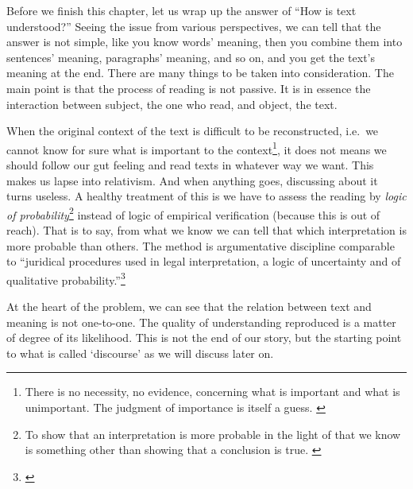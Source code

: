 Before we finish this chapter, let us wrap up the answer of ``How is text understood?'' Seeing the issue from various perspectives, we can tell that the answer is not simple, like you know words' meaning, then you combine them into sentences' meaning, paragraphs' meaning, and so on, and you get the text's meaning at the end. There are many things to be taken into consideration. The main point is that the process of reading is not passive. It is in essence the interaction between subject, the one who read, and object, the text.

When the original context of the text is difficult to be reconstructed, i.e.\ we cannot know for sure what is important to the context\footnote{There is no necessity, no evidence, concerning what is important and what is unimportant. The judgment of importance is itself a guess. \citep[p.~77]{ricoeur:interpretation}}, it does not means we should follow our gut feeling and read texts in whatever way we want. This makes us lapse into relativism. And when anything goes, discussing about it turns useless. A healthy treatment of this is we have to assess the reading by \emph{logic of probability}\footnote{To show that an interpretation is more probable in the light of that we know is something other than showing that a conclusion is true. \citep[p.~78]{ricoeur:interpretation}} instead of logic of empirical verification (because this is out of reach). That is to say, from what we know we can tell that which interpretation is more probable than others. The method is argumentative discipline comparable to ``juridical procedures used in legal interpretation, a logic of uncertainty and of qualitative probability.''\footnote{\citealp[p.~78]{ricoeur:interpretation}}

At the heart of the problem, we can see that the relation between text and meaning is not one-to-one. The quality of understanding reproduced is a matter of degree of its likelihood. This is not the end of our story, but the starting point to what is called `discourse' as we will discuss later on.
